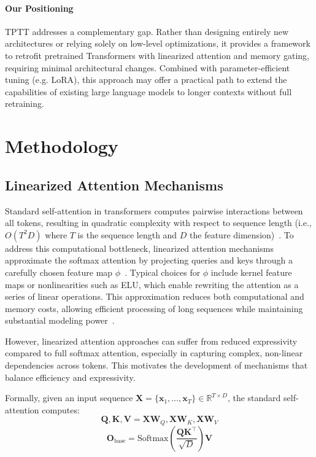 \documentclass[10pt,a4paper]{article}
\begin{document}
\paragraph{Our Positioning}  
TPTT addresses a complementary gap. Rather than designing entirely new architectures or relying solely on low-level optimizations, it provides a framework to retrofit pretrained Transformers with linearized attention and memory gating, requiring minimal architectural changes. Combined with parameter-efficient tuning (e.g. LoRA), this approach may offer a practical path to extend the capabilities of existing large language models to longer contexts without full retraining.


\section{Methodology}

\subsection{Linearized Attention Mechanisms}

Standard self-attention in transformers computes pairwise interactions between all tokens, resulting in quadratic complexity with respect to sequence length (i.e., $O(T^2 D)$ where $T$ is the sequence length and $D$ the feature dimension)~\cite{vaswani2017attention}. To address this computational bottleneck, linearized attention mechanisms approximate the softmax attention by projecting queries and keys through a carefully chosen feature map $\phi$~\cite{katharopoulos2020transformers, wang2020linformer, mercat2024linearizing, yang2024parallelizing}. Typical choices for $\phi$ include kernel feature maps or nonlinearities such as ELU, which enable rewriting the attention as a series of linear operations. This approximation reduces both computational and memory costs, allowing efficient processing of long sequences while maintaining substantial modeling power~\cite{gu2023mamba, dao2023flashattention, zhang2024lolcats, lan2025liger}.

However, linearized attention approaches can suffer from reduced expressivity compared to full softmax attention, especially in capturing complex, non-linear dependencies across tokens. This motivates the development of mechanisms that balance efficiency and expressivity.

Formally, given an input sequence $\mathbf{X} = \{\mathbf{x}_1, \dots, \mathbf{x}_T\} \in \mathbb{R}^{T \times D}$, the standard self-attention computes:
\begin{equation}
\mathbf{Q}, \mathbf{K}, \mathbf{V} = \mathbf{X}\mathbf{W}_Q, \mathbf{X}\mathbf{W}_K, \mathbf{X}\mathbf{W}_V
\end{equation}
\begin{equation}
\mathbf{O}_{\text{base}} = \text{Softmax}\left(\frac{\mathbf{Q}\mathbf{K}^\top}{\sqrt{D}}\right)\mathbf{V}
\end{equation}
\end{document}
